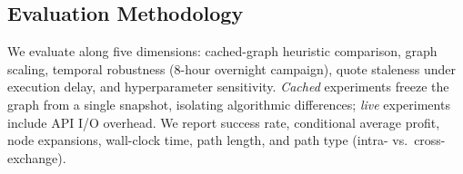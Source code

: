 \subsection{Evaluation Methodology}
\label{sec:evaluation}

We evaluate along five dimensions: cached-graph heuristic comparison, graph scaling, temporal robustness (8-hour overnight campaign), quote staleness under execution delay, and hyperparameter sensitivity. \emph{Cached} experiments freeze the graph from a single snapshot, isolating algorithmic differences; \emph{live} experiments include API I/O overhead. We report success rate, conditional average profit, node expansions, wall-clock time, path length, and path type (intra- vs.\ cross-exchange).
